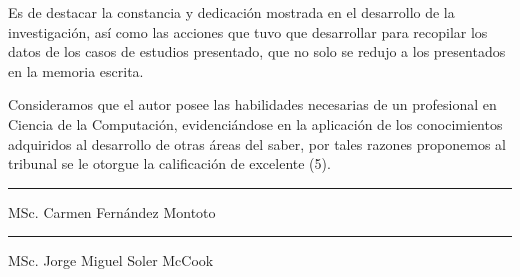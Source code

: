 \begin{opinion}
Es de destacar la constancia y dedicación mostrada en el desarrollo de la investigación, así como las acciones que tuvo que desarrollar para recopilar los datos de los casos de estudios presentado, que no solo se redujo a los presentados en la memoria escrita.  

Consideramos que el autor posee las habilidades necesarias de un profesional en Ciencia de la Computación, evidenciándose en la aplicación de los conocimientos adquiridos al desarrollo de otras áreas del saber, por tales razones proponemos al tribunal se le otorgue la calificación de excelente (5).

\vspace{2cm} 
\begin{flushleft}
  \begin{minipage}{0.4\textwidth}
    \hrule %
    \vspace{0.5cm} %
    MSc. Carmen Fernández Montoto 
   \end{minipage}
   \hfill 
   \begin{minipage}{0.4\textwidth}
        \hrule %
        \vspace{0.5cm} %
        MSc. Jorge Miguel Soler McCook 
    \end{minipage}
\end{flushleft}

\end{opinion}